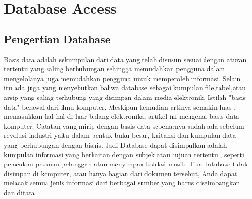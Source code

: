 
\section{Database Access}

\subsection{Pengertian Database}
	Basis data adalah sekumpulan dari data yang telah disusun sesuai dengan aturan tertentu yang saling berhubungan sehingga memudahkan pengguna dalam mengelolanya juga memudahkan pengguna untuk memperoleh informasi. Selain itu ada juga yang menyebutkan bahwa database sebagai kumpulan ﬁle,tabel,atau arsip yang saling terhubung yang disimpan dalam media elektronik.
	Istilah "basis data" berawal dari ilmu komputer. Meskipun kemudian artinya semakin luas , memasukkan hal-hal di luar bidang elektronika, artikel ini mengenai basis data komputer. Catatan yang mirip dengan basis data sebenarnya sudah ada sebelum revolusi industri yaitu dalam bentuk buku besar, kuitansi dan kumpulan data yang berhubungan dengan bisnis.
	Jadi Database dapat disimpulkan adalah kumpulan informasi yang berkaitan dengan subjek atau tujuan tertentu , seperti pelacakan pesanan pelanggan atau menyimpan koleksi musik. Jika database tidak disimpan di komputer, atau hanya bagian dari dokumen tersebut, Anda dapat melacak semua jenis informasi dari berbagai sumber yang harus diseimbangkan dan ditata .

